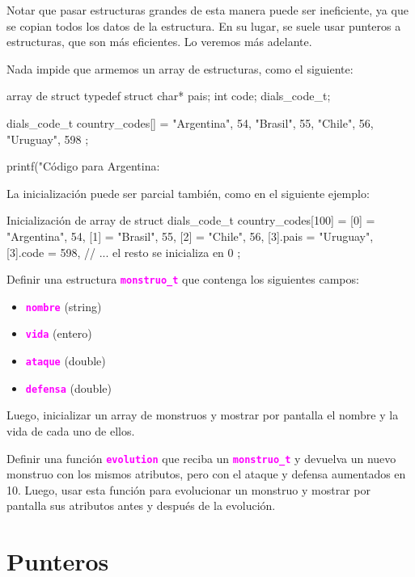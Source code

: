 \documentclass[]{scrartcl}
\newcommand{\hl}[1]{\textcolor{magenta}{\textbf{\texttt{#1}}}}
\begin{document}
Notar que pasar estructuras grandes de esta manera puede ser ineficiente, ya que se copian todos los datos de la estructura. En su lugar, se suele usar punteros a estructuras, que son más eficientes. Lo veremos más adelante.

Nada impide que armemos un array de estructuras, como el siguiente:

\begin{cbox}[]{array de struct}
typedef struct {
  char* pais;
  int code;
} dials_code_t;

dials_code_t country_codes[] = {
  {"Argentina", 54},
  {"Brasil", 55},
  {"Chile", 56},
  {"Uruguay", 598}
};

printf("Código para Argentina: %
\end{cbox}

La inicialización puede ser parcial también, como en el siguiente ejemplo:

\begin{cbox}[]{Inicialización de array de struct}
dials_code_t country_codes[100] = {
  [0] = {"Argentina", 54},
  [1] = {"Brasil", 55},
  [2] = {"Chile", 56},
  [3].pais = "Uruguay", [3].code = 598,
  // ... el resto se inicializa en 0
};
\end{cbox}

\begin{exbox}
  Definir una estructura \hl{monstruo\_t} que contenga los siguientes campos:
  \begin{itemize}
    \item \hl{nombre} (string)
    \item \hl{vida} (entero)
    \item \hl{ataque} (double)
    \item \hl{defensa} (double)
  \end{itemize}
  Luego, inicializar un array de monstruos y mostrar por pantalla el nombre y la vida de cada uno de ellos.
\end{exbox}

\begin{exbox}
  Definir una función \hl{evolution} que reciba un \hl{monstruo\_t} y devuelva un nuevo monstruo con los mismos atributos, pero con el ataque y defensa aumentados en 10. Luego, usar esta función para evolucionar un monstruo y mostrar por pantalla sus atributos antes y después de la evolución.
\end{exbox} 

\newpage
\section*{Punteros}
\end{document}

